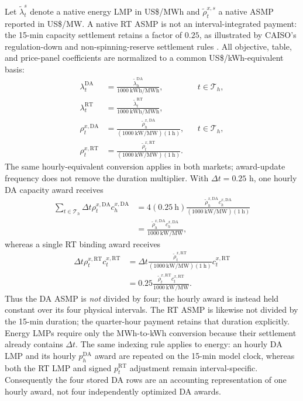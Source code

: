 \documentclass[final,5p,times]{elsarticle}
\newcommand{\dt}{\Delta t}
\newcommand{\DA}{\mathrm{DA}}
\newcommand{\RT}{\mathrm{RT}}
\newcommand{\calT}{\mathcal{T}}
\begin{document}
Let $\widetilde\lambda_t^s$ denote a native energy LMP in US\$/MWh and
$\widetilde\rho_t^{x,s}$ a native ASMP reported in US\$/MW. A native RT
ASMP is not an interval-integrated payment: the 15-min capacity settlement
retains a factor of $0.25$, as illustrated by CAISO's regulation-down and
non-spinning-reserve settlement rules \cite{caisoRTRegDownSettlement} \cite{caisoRTNonSpinSettlement}.
All objective, table, and price-panel coefficients are normalized to
a common US\$/kWh-equivalent basis:
\begin{align}
\lambda_t^{\DA}&=\frac{\widetilde\lambda_h^{\DA}}{1000~\mathrm{kWh/MWh}},
&&t\in\calT_h,\\
\lambda_t^{\RT}&=\frac{\widetilde\lambda_t^{\RT}}{1000~\mathrm{kWh/MWh}},
&& \label{eq:lmp_normalization}\\
\rho_t^{x,\DA}&=\frac{\widetilde\rho_h^{x,\DA}}{(1000~\mathrm{kW/MW})(1~\mathrm{h})},
&&t\in\calT_h, \label{eq:da_asmp_normalization}\\
\rho_t^{x,\RT}&=\frac{\widetilde\rho_t^{x,\RT}}
{(1000~\mathrm{kW/MW})(1~\mathrm{h})}.
&& \label{eq:rt_asmp_normalization}
\end{align}
The same hourly-equivalent conversion applies in both markets; award-update
frequency does not remove the duration multiplier. With $\dt=0.25$ h,
one hourly DA capacity award receives
\begin{align}
\sum_{t\in\calT_h}\dt\rho_t^{x,\DA}c_h^{x,\DA}
&=4(0.25~\mathrm{h})
\frac{\widetilde\rho_h^{x,\DA}c_h^{x,\DA}}
{(1000~\mathrm{kW/MW})(1~\mathrm{h})}\nonumber\\
&=\frac{\widetilde\rho_h^{x,\DA}c_h^{x,\DA}}{1000~\mathrm{kW/MW}},
\label{eq:da_capacity_payment_check}
\end{align}
whereas a single RT binding award receives
\begin{align}
\dt\rho_t^{x,\RT}c_t^{x,\RT}
&=\dt\frac{\widetilde\rho_t^{x,\RT}}
{(1000~\mathrm{kW/MW})(1~\mathrm{h})}c_t^{x,\RT}\nonumber\\
&=0.25\frac{\widetilde\rho_t^{x,\RT}c_t^{x,\RT}}{1000~\mathrm{kW/MW}}.
\label{eq:rt_capacity_payment_check}
\end{align}
Thus the DA ASMP is \emph{not} divided by four; the hourly award is instead
held constant over its four physical intervals. The RT ASMP is likewise
not divided by the 15-min duration; the quarter-hour payment retains that
duration explicitly. Energy
LMPs require only the MWh-to-kWh conversion because their settlement already
contains $\dt$. The same indexing rule applies to energy: an hourly DA LMP and
its hourly $p_h^{\DA}$ award are repeated on the 15-min model clock, whereas
both the RT LMP and signed $p_t^{\RT}$ adjustment remain interval-specific.
Consequently the four stored DA rows are an accounting representation of one
hourly award, not four independently optimized DA awards.
\end{document}
